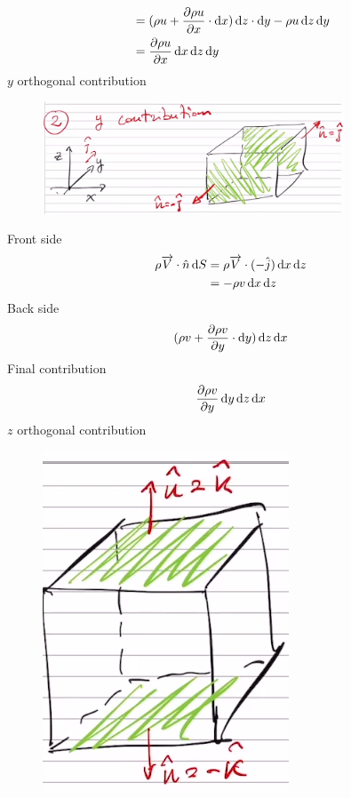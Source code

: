 \documentclass[class=report, crop=false, 12pt,a4paper]{standalone}
\begin{document}
\begin{align}
  &= (\rho u + \frac{\partial \rho u}{\partial x} \cdot \dif x) \dif z \cdot \dif y - \rho u \dif z \dif y\\
  &= \frac{\partial \rho u}{\partial x} \dif x \dif z \dif y
\end{align}
$y$ orthogonal contribution
\begin{figure}[H]
  \centering
  \includegraphics[width = 0.8\textwidth]{../img/infinitesimalcubewithorthoy.png}
\end{figure}
Front side
\begin{align}
  \rho \overrightarrow{V} \cdot \hat{n} \dif S &= \rho \overrightarrow{V} \cdot (- \hat{j}) \dif x \dif z\\
  &= -\rho v \dif x \dif z
\end{align}
Back side
\begin{equation}
  (\rho v + \frac{\partial \rho v}{\partial y} \cdot \dif y) \dif z \dif x
\end{equation}
Final contribution
\begin{equation}
  \frac{\partial \rho v}{\partial y} \dif y \dif z \dif x 
\end{equation}
$z$ orthogonal contribution
\begin{figure}[H]
  \centering
  \includegraphics[width = 0.5 \textwidth]{../img/infinitesimalcubewithorthoz.png}
\end{figure}
\end{document}

